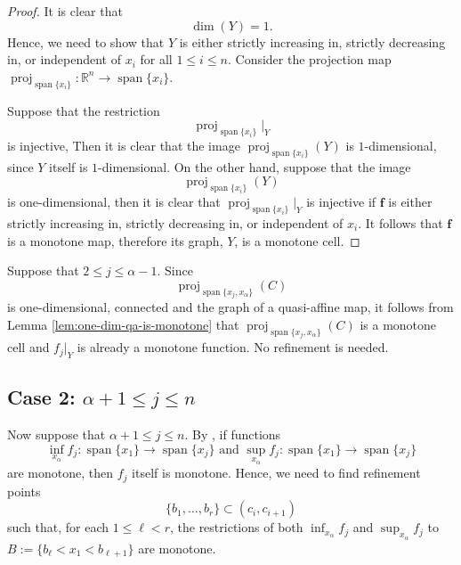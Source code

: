\documentclass[
]{book}
\theoremstyle{definition}
\theoremstyle{definition}
\theoremstyle{definition}
\theoremstyle{definition}
\theoremstyle{remark}
\begin{document}
\begin{proof}
It is clear that
\[
\dim(Y) = 1.
\]
Hence, we need to show that \(Y\) is either strictly increasing in, strictly decreasing in, or independent of \(x_i\) for all \(1\le i \le n\).
Consider the projection map \({\operatorname{proj}_{{\operatorname{span} \{x_i\}}}} : \mathbb{R}^n \to {\operatorname{span} \{x_i\}}\).

Suppose that the restriction
\[
{\operatorname{proj}_{{\operatorname{span} \{x_i\}}}}\vert_Y
\]
is injective, Then it is clear that the image \({\operatorname{proj}_{{\operatorname{span} \{x_i\}}}}(Y)\) is \(1\)-dimensional, since \(Y\) itself is \(1\)-dimensional. On the other hand, suppose that the image
\[
{\operatorname{proj}_{{\operatorname{span} \{x_i\}}}}(Y)
\]
is one-dimensional, then it is clear that \({\operatorname{proj}_{{\operatorname{span} \{x_i\}}}}\vert_Y\) is injective if \(\mathbf{f}\) is either strictly increasing in, strictly decreasing in, or independent of \(x_i\). It follows that \(\mathbf{f}\) is a monotone map, therefore its graph, \(Y\), is a monotone cell.
\end{proof}

Suppose that \(2 \le j \le \alpha - 1\).
Since
\[
{\operatorname{proj}_{{\operatorname{span} \{x_j,x_\alpha\}}}}(C)
\]
is one-dimensional, connected and the graph of a quasi-affine map, it follows from Lemma \ref{lem:one-dim-qa-is-monotone} that \({\operatorname{proj}_{{\operatorname{span} \{x_j,x_\alpha\}}}}(C)\) is a monotone cell and \(f_j\vert_Y\) is already a monotone function. No refinement is needed.

\hypertarget{case-2-alpha-1-le-j-le-n}{%
\subsection{\texorpdfstring{Case 2: \(\alpha + 1 \le j \le n\)}{Case 2: \textbackslash alpha + 1 \textbackslash le j \textbackslash le n}}\label{case-2-alpha-1-le-j-le-n}}

Now suppose that \(\alpha + 1 \le j \le n\).
By \citep[Theorem 3]{bgv13}, if functions \[\inf_{x_\alpha} f_j : {\operatorname{span} \{x_1\}} \to {\operatorname{span} \{x_j\}} \text{ and } \sup_{x_\alpha} f_j : {\operatorname{span} \{x_1\}} \to {\operatorname{span} \{x_j\}}\] are monotone, then \(f_j\) itself is monotone.
Hence, we need to find refinement points
\[
\{ b_1,\ldots,b_r \} \subset (c_i,c_{i+1})
\]
such that, for each \(1\le \ell < r\), the restrictions of both \(\inf_{x_\alpha} f_j\) and \(\sup_{x_\alpha} f_j\) to \(B := \{ b_\ell < x_1 < b_{\ell + 1} \}\) are monotone.
\end{document}
